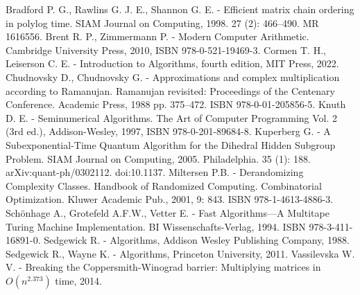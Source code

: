 \documentclass{article}
\begin{document}

\newpage
\begin{thebibliography}{10}
	 Bradford P. G., Rawlins G. J. E., Shannon G. E. - Efficient matrix chain ordering in polylog time. SIAM Journal on Computing, 1998. 27 (2): 466–490. MR 1616556.
	 Brent R. P., Zimmermann P. - Modern Computer Arithmetic. Cambridge University Press, 2010, ISBN 978-0-521-19469-3.
	 Cormen T. H., Leiserson C. E. - Introduction to Algorithms, fourth edition, MIT Press, 2022.
	 Chudnovsky D., Chudnovsky G. - Approximations and complex multiplication according to Ramanujan. Ramanujan revisited: Proceedings of the Centenary Conference. Academic Press, 1988 pp. 375–472. ISBN 978-0-01-205856-5.
	 Knuth D. E. - Seminumerical Algorithms. The Art of Computer Programming Vol. 2 (3rd ed.), Addison-Wesley, 1997, ISBN 978-0-201-89684-8.
	 Kuperberg G. - A Subexponential-Time Quantum Algorithm for the Dihedral Hidden Subgroup Problem. SIAM Journal on Computing, 2005. Philadelphia. 35 (1): 188. arXiv:quant-ph/0302112. doi:10.1137.
	 Miltersen P.B.  - Derandomizing Complexity Classes. Handbook of Randomized Computing. Combinatorial Optimization. Kluwer Academic Pub., 2001,  9: 843. ISBN 978-1-4613-4886-3.
	 Schönhage A., Grotefeld A.F.W., Vetter E. - Fast Algorithms—A Multitape Turing Machine Implementation. BI Wissenschafts-Verlag, 1994. ISBN 978-3-411-16891-0.
	 Sedgewick R. - Algorithms, Addison Wesley Publishing Company, 1988.
	 Sedgewick R., Wayne K. - Algorithms, Princeton University, 2011.
	 Vassilevska W. V. - Breaking the Coppersmith-Winograd barrier: Multiplying matrices in $O(n^{2.373})$ time, 2014.
\end{thebibliography}

\end{document}
